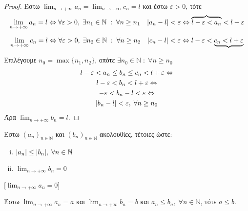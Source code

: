 \begin{proof}
\item {}
  Έστω $ \lim_{n \to +\infty} a_{n} = \lim_{n \to +\infty} c_{n} = l $ και 
  έστω $ \varepsilon >0 $, τότε
  \[ \lim_{n \to +\infty} a_{n} = l \Leftrightarrow \forall 
    \varepsilon >0, \; \exists n_{1} \in \mathbb{N} \; : \; \forall n 
    \geq n_{1} \quad \abs{a_{n} - l} < \varepsilon \Leftrightarrow 
  \overbrace{l - \varepsilon < a_{n}} < l + \varepsilon \] 

  \[ \lim_{n \to +\infty} c_{n} = l \Leftrightarrow \forall 
    \varepsilon >0, \; \exists n_{2} 
    \in \mathbb{N} \; : \; \forall n \geq n_{2} \quad \abs{c_{n} - l} 
    < \varepsilon \Leftrightarrow 
  l - \varepsilon < \underbrace{c_{n} < l + \varepsilon} \]

  Επιλέγουμε $ n_{0} = \max \{ n_{1}, n_{2} \} $, οπότε 
  $ \exists n_{0} \in \mathbb{N} \; : \; 
  \forall n \geq n_{0} $
  \begin{gather*}
    l - \varepsilon < a_{n} \leq b_{n} \leq c_{n} < l + 
    \varepsilon \Leftrightarrow \\
    l - \varepsilon < b_{n} < l + \varepsilon \Leftrightarrow \\
    - \varepsilon < b_{n} - l < \varepsilon \Leftrightarrow \\
    \abs{b_{n}-l} < \varepsilon, \; \forall n \geq n_{0}
  \end{gather*}
  Άρα $ \lim_{n \to +\infty} b_{n} = l $.
\end{proof}

\begin{cor}
  Έστω $ (a_{n})_{n \in \mathbb{N}} $ και $ 
  (b_{n})_{n \in \mathbb{N}} $ ακολουθίες, τέτοιες ώστε: 

  \vspace{\baselineskip}

  \begin{minipage}{0.25\textwidth}
    \begin{enumerate}[i)]
      \item $ \abs{a_{n}} \leq \abs{b_{n}}, \; \forall n \in 
        \mathbb{N} $ \hfill {}
      \item $ \lim_{n \to +\infty} b_{n} = 0$ \hfill {}
    \end{enumerate}
  \end{minipage}

  [$ \lim_{n \to +\infty} a_{n} = 0 $]
\end{cor}

\begin{mybox3}
  \begin{prop}\label{prop:aleqb}
    Έστω $ \lim_{n \to +\infty} a_{n} = a $ και $ 
    \lim_{n \to +\infty} b_{n} = b $ και
    $ a_{n} \leq b_{n}, \; \forall n \in \mathbb{N} $, τότε $ a \leq b $.
  \end{prop}
\end{mybox3}

